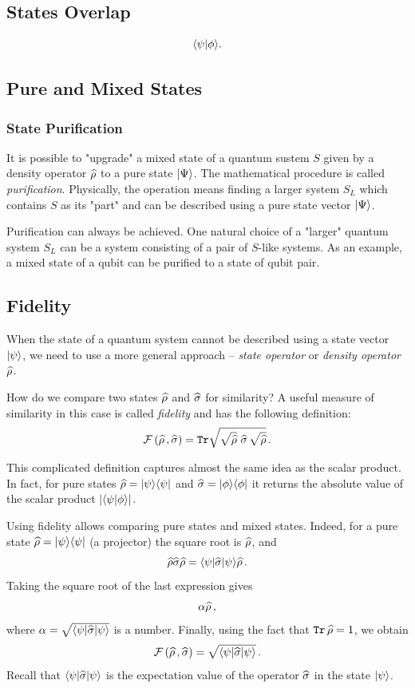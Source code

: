 \subsection{States Overlap}
\[
\langle{\psi}|{\phi\rangle}.
\]

\subsection{Pure and Mixed States}

\subsubsection{State Purification}
It is possible to "upgrade" a mixed state of a quantum sustem $S$ given by a density operator $\widehat{\rho}$ to a pure state $|{\Psi}\rangle$. The mathematical procedure is called \emph{purification}. Physically, the operation means finding a larger system $S_L$ which contains $S$ as its "part" and can be described using a pure state vector $|{\Psi}\rangle$.

Purification can always be achieved. One natural choice of a "larger" quantum system $S_L$ can be a system consisting of a pair of $S$-like systems. As an example, a mixed state of a qubit can be purified to a state of qubit pair.


\subsection{Fidelity}
When the state of a quantum system cannot be described using a state vector $|{\psi}\rangle$, we need to use a more general approach -- \emph{state operator} or \emph{density operator} $\widehat{\rho}$.

How do we compare two states $\widehat{\rho}$ and $\widehat{\sigma}$ for similarity? A useful measure of similarity in this case is called \emph{fidelity} and has the following definition:
\[
\mathcal{F}\,(\widehat{\rho}\,,\widehat{\sigma}) = \mathtt{Tr}\sqrt{\sqrt{\widehat{\rho}}\,\,\widehat{\sigma}\,\sqrt{\widehat{\rho}}}\,.
\]

This complicated definition captures almost the same idea as the scalar product. In fact, for pure states $\widehat{\rho}=|{\psi}\rangle\langle{\psi}|$ and $\widehat{\sigma}=|{\phi}\rangle\langle{\phi}|$ it returns the absolute value of the scalar product $|\langle{\psi}|{\phi\rangle}|$.

Using fidelity allows comparing pure states and mixed states. Indeed, for a pure state $\widehat{\rho}=|{\psi}\rangle\langle{\psi}|$ (a projector) the square root is $\widehat{\rho}$, and 
\[
\widehat{\rho}\widehat{\sigma}\widehat{\rho}=\langle{\psi}|\widehat{\sigma}|{\psi}\rangle\widehat{\rho}\,.
\]
Taking the square root of the last expression gives
\[
\alpha\widehat{\rho}\,,
\]
where $\alpha=\sqrt{\langle{\psi}|\widehat{\sigma}|{\psi}\rangle}$ is a number. Finally, using the fact that $\mathtt{Tr}\,\widehat{\rho}=1$, we obtain
\[
\mathcal{F}\,(\widehat{\rho}\,,\widehat{\sigma}) =\sqrt{\langle{\psi}|\widehat{\sigma}|{\psi}\rangle}\,.
\]
Recall that $\langle{\psi}|\widehat{\sigma}|{\psi}\rangle$ is the expectation value of the operator $\widehat{\sigma}$ in the state $|{\psi}\rangle$.

